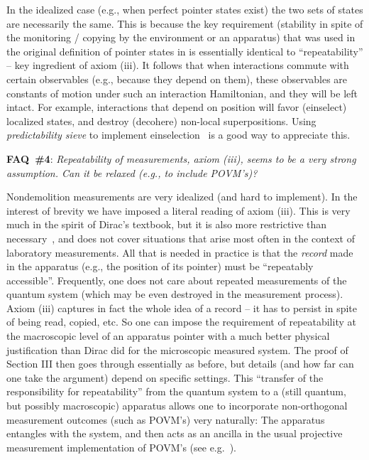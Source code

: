 \documentclass[aps,amsmath,amssymb,amsfonts,12pt]{revtex4-1}
\newcommand{\+}         {\dagger}
\begin{document}
{{{In the idealized case (e.g., when perfect pointer states exist) the two sets of states are necessarily the same. This is because the key requirement (stability in spite of the monitoring / copying by the environment or an apparatus) that was used in the original definition of pointer states in \cite{69} is essentially identical to ``repeatability'' -- key ingredient of axiom (iii). It follows that when interactions commute with certain observables (e.g., because they depend on them), these observables are constants of motion under such an interaction Hamiltonian, and they will be left intact. For example, interactions that depend on position will favor (einselect) localized states, and destroy (decohere) non-local superpositions. Using {\it predictability sieve} to implement einselection~\cite{5,75,45,52}
is a good way to appreciate this.

{\bf FAQ~\#4}: {\it Repeatability of measurements, axiom (iii), seems to be a very strong assumption. Can it be relaxed (e.g., to include POVM's)?}

Nondemolition measurements are very idealized (and hard to implement). In the interest of brevity we have imposed a literal reading of axiom (iii). This is very much in the spirit of Dirac's textbook, but it is also more restrictive than necessary~\cite{79}, and does not cover situations that arise most often in the context of laboratory measurements. All that is needed in practice is that the {\it record} made in the apparatus (e.g., the position of its pointer) must be ``repeatably accessible''. Frequently, one does not care about repeated measurements of the quantum system (which may be even destroyed in the measurement process). Axiom (iii) captures in fact the whole idea of a record -- it has to persist in spite of being read, copied, etc. So one can impose the requirement of repeatability at the macroscopic level of an apparatus pointer with a much better physical justification than Dirac did for the microscopic measured system. The proof of Section III then goes through essentially as before, but details (and how far can one take the argument) depend on specific settings. This ``transfer of the responsibility for repeatability'' from the quantum system to a (still quantum, but possibly macroscopic) apparatus allows one to incorporate non-orthogonal measurement outcomes (such as POVM's) very naturally: The apparatus entangles with the system, and then acts as an ancilla in the usual projective measurement implementation of POVM's (see e.g.~\cite{NC}).

}}}
\end{document}
